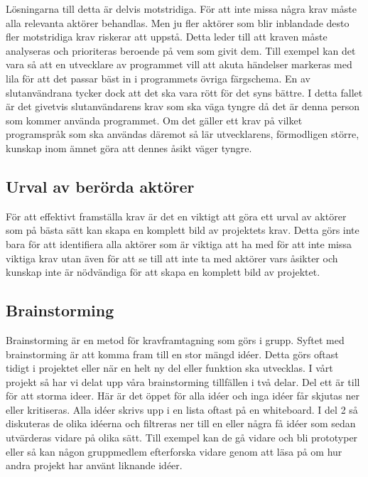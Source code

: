 Lösningarna till detta är delvis motstridiga. För att inte missa några krav måste alla relevanta aktörer behandlas. Men ju fler aktörer som blir inblandade desto fler motstridiga krav riskerar att uppstå. Detta leder till att kraven måste analyseras och prioriteras beroende på vem som givit dem.
Till exempel kan det vara så att en utvecklare av programmet vill att akuta händelser markeras med lila för att det passar bäst in i programmets övriga färgschema. En av slutanvändrana tycker dock att det ska vara rött för det syns bättre. I detta fallet är det givetvis slutanvändarens krav som ska väga tyngre då det är denna person som kommer använda programmet. 
Om det gäller ett krav på vilket programspråk som ska användas däremot så lär utvecklarens, förmodligen större, kunskap inom ämnet göra att dennes åsikt väger tyngre.

\subsection{Urval av berörda aktörer}
För att effektivt framställa krav är det en viktigt att göra ett urval av aktörer som på bästa sätt kan skapa en komplett bild av projektets krav\cite{cs_choose_right}. Detta görs inte bara för att identifiera alla aktörer som är viktiga att ha med för att inte missa viktiga krav utan även för att se till att inte ta med aktörer vars åsikter och kunskap inte är nödvändiga för att skapa en komplett bild av projektet.

\subsection{Brainstorming}
Brainstorming är en metod för kravframtagning som görs i grupp. Syftet med brainstorming är att komma fram till en stor mängd idéer. Detta görs oftast tidigt i projektet eller när en helt ny del eller funktion ska utvecklas. I vårt projekt så har vi delat upp våra brainstorming tillfällen i två delar. Del ett är till för att storma ideer. Här är det öppet för alla idéer och inga idéer får skjutas ner eller kritiseras. Alla idéer skrivs upp i en lista oftast på en whiteboard. I del 2 så diskuteras de olika idéerna och filtreras ner till en eller några få idéer som sedan utvärderas vidare på olika sätt. Till exempel kan de gå vidare och bli prototyper eller så kan någon gruppmedlem efterforska vidare genom att läsa på om hur andra projekt har använt liknande idéer. 

